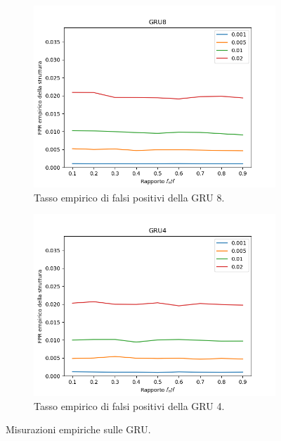 \documentclass[../../main.tex]{subfiles}
\begin{document}
\begin{figure}[H]
        \begin{subfigure}[b]{0.32\textwidth}
            \centering
            \includegraphics[width = \textwidth]{immagini/7/LBF/GRU8_FPR.png}
            \caption{Tasso empirico di falsi positivi della GRU 8.}
            \label{fig:LBFFPR_GRU8}
        \end{subfigure}
        \begin{subfigure}[b]{0.32\textwidth}
            \centering
            \includegraphics[width = \textwidth]{immagini/7/LBF/GRU4_FPR.png}
            \caption{Tasso empirico di falsi positivi della GRU 4.}
            \label{fig:LBFFPR_GRU4}
        \end{subfigure}
        \caption{Misurazioni empiriche sulle GRU.}
        \label{fig:GRUEmpiricoLBF}
    \end{figure}
\end{document}
